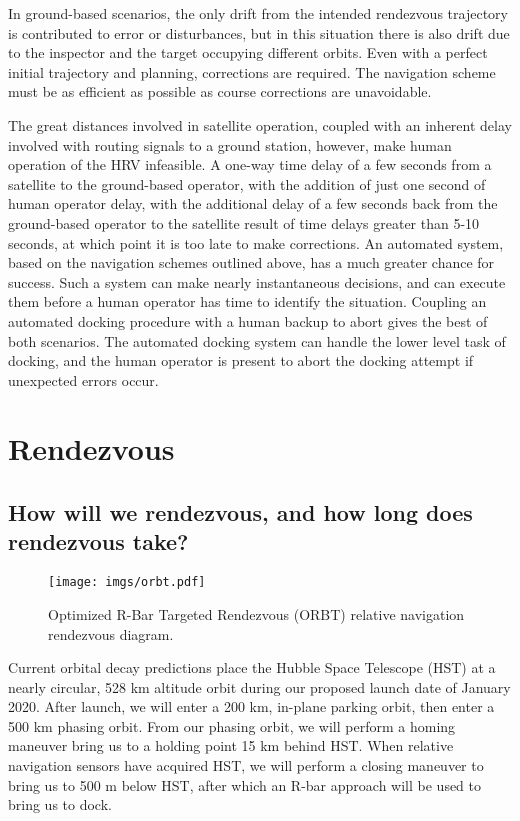 \documentclass[onecolumn,10pt]{jhwhw}
\begin{document}
In ground-based scenarios, the only drift from the intended rendezvous trajectory is contributed to error or disturbances, but in this situation there is also drift due to the inspector and the target occupying different orbits. Even with a perfect initial trajectory and planning, corrections are required. The navigation scheme must be as efficient as possible as course corrections are unavoidable.

The great distances involved in satellite operation, coupled with an inherent delay involved with routing signals to a ground station, however, make human operation of the HRV infeasible. A one-way time delay of a few seconds from a satellite to the ground-based operator, with the addition of just one second of human operator delay, with the additional delay of a few seconds back from the ground-based operator to the satellite result of time delays greater than 5-10 seconds, at which point it is too late to make corrections. An automated system, based on the navigation schemes outlined above, has a much greater chance for success. Such a system can make nearly instantaneous decisions, and can execute them before a human operator has time to identify the situation. Coupling an automated docking procedure with a human backup to abort gives the best of both scenarios. The automated docking system can handle the lower level task of docking, and the human operator is present to abort the docking attempt if unexpected errors occur.

\section{Rendezvous}

\subsection{How will we rendezvous, and how long does rendezvous take?}
\begin{figure}[t!]
\begin{center}
\texttt{[image: imgs/orbt.pdf]}
\caption{Optimized R-Bar Targeted Rendezvous (ORBT) relative navigation rendezvous diagram.}
\end{center}
\end{figure}

Current orbital decay predictions place the Hubble Space Telescope (HST) at a nearly circular, 528 km altitude orbit during our proposed launch date of January 2020. After launch, we will enter a 200 km, in-plane parking orbit, then enter a 500 km phasing orbit. From our phasing orbit, we will perform a homing maneuver bring us to a holding point 15 km behind HST. When relative navigation sensors have acquired HST, we will perform a closing maneuver to bring us to 500 m below HST, after which an R-bar approach will be used to bring us to dock.
\end{document}
